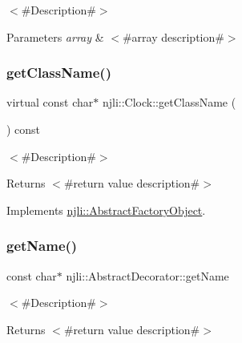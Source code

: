$<$\#\+Description\#$>$


\begin{DoxyParams}{Parameters}
{\em array} & $<$\#array description\#$>$ \\
\hline
\end{DoxyParams}
\mbox{\label{classnjli_1_1_clock_a54952cf183ca49429004733aad6b3fd1}} 
\subsubsection{\texorpdfstring{get\+Class\+Name()}{getClassName()}}
{\footnotesize\ttfamily virtual const char$\ast$ njli\+::\+Clock\+::get\+Class\+Name (\begin{DoxyParamCaption}{ }\end{DoxyParamCaption}) const\hspace{0.3cm}{\ttfamily [virtual]}}

$<$\#\+Description\#$>$

\begin{DoxyReturn}{Returns}
$<$\#return value description\#$>$ 
\end{DoxyReturn}


Implements \mbox{\hyperlink{classnjli_1_1_abstract_factory_object_af4151e41b80d5bc3fc42822c67fc2278}{njli\+::\+Abstract\+Factory\+Object}}.

\mbox{\label{classnjli_1_1_clock_ad41266885be835f3ee602311e20877a4}} 
\subsubsection{\texorpdfstring{get\+Name()}{getName()}}
{\footnotesize\ttfamily const char$\ast$ njli\+::\+Abstract\+Decorator\+::get\+Name}

$<$\#\+Description\#$>$

\begin{DoxyReturn}{Returns}
$<$\#return value description\#$>$ 
\end{DoxyReturn}
\mbox{\label{classnjli_1_1_clock_ac4ca71716ed832be357f15f8262c8448}} 
